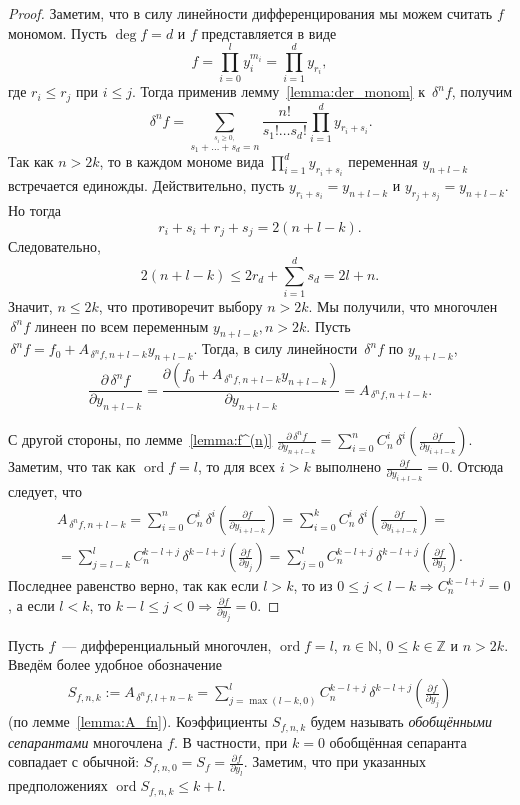 \documentclass[11pt]{article}
\DeclareMathOperator{\ord}{ord}
\renewcommand{\le}{\leqslant}
\renewcommand{\ge}{\geqslant}
\theoremstyle{plain1}
\theoremstyle{plain2}
\theoremstyle{plain}
\theoremstyle{plain3}
\theoremstyle{definition}
\theoremstyle{remark}
\begin{document}
\begin{proof}
Заметим, что в силу линейности дифференцирования мы можем считать
$f$ мономом. Пусть $\deg f = d$ и $f$ представляется в
виде
$$
f=\prod\limits_{i=0}^ly_i^{m_i}=\prod\limits_{i=1}^{d}y_{r_i},
$$
где $r_i\le r_j$ при $i \le j$. Тогда применив лемму~\ref{lemma:der_monom} к $\,\delta^n f$,
получим
$$
\,\delta^n f=\sum\limits_{\stackrel{s_i\ge0,}{
s_1+\ldots+s_d=n}}\frac{n!}{s_1!\ldots s_d!}
\prod\limits_{i=1}^dy_{r_i+s_i}.
$$
Так как $n>2k$, то в каждом мономе вида $\prod_{i=1}^d y_{r_i+s_i}$
переменная $y_{n+l-k}$ встречается единожды. Действительно, пусть
$y_{r_i+s_i}=y_{n+l-k}$ и $y_{r_j+s_j}=y_{n+l-k}$. Но тогда
$$
r_i+s_i+r_j+s_j = 2(n+l-k).
$$
Следовательно,
$$
2(n+l-k)\le 2r_d + \sum_{i=1}^d s_d = 2l +n.
$$
Значит, $n \le 2k$, что противоречит выбору $n>2k$. Мы получили, что многочлен $\,\delta^n f$ линеен по всем переменным $y_{n+l-k},n>2k $. Пусть $\,\delta^n f=f_0+A_{\,\delta^n f,n+l-k}y_{n+l-k}$. Тогда, в силу линейности $\,\delta^n f$ по $y_{n+l-k}$,
$$
\frac{\partial \,\delta^n f}{\partial y_{n+l-k}}=\frac{\partial (f_0+A_{\,\delta^n f,n+l-k}y_{n+l-k})}{\partial y_{n+l-k}}=A_{\,\delta^n f,n+l-k}.
$$

С другой стороны, по лемме~\ref{lemma:f^(n)} $\frac{\partial \,\delta^n f}{\partial y_{n+l-k}}= \sum\limits_{i=0}^n  C_n^i  \,\delta^i\left(\frac{\partial f}{\partial y_{i+l-k}}\right)$. Заметим, что так как $\ord f = l$, то для всех $i>k$ выполнено $\frac{\partial f}{\partial y_{i+l-k}}=0$. Отсюда следует, что 
\begin{gather*}
A_{\,\delta^n f,n+l-k}=\sum\limits_{i=0}^n  C_n^i  \,\delta^i\left(\frac{\partial f}{\partial y_{i+l-k}}\right)=\sum\limits_{i=0}^k  C_n^i  \,\delta^i \left(\frac{\partial f}{\partial y_{i+l-k}}\right)=\\
=\sum\limits_{j=l-k}^l  C_n^{k-l+j}  \,\delta^{k-l+j}\left(\frac{\partial f}{\partial y_{j}}\right)=\sum\limits_{j=0}^{l}C_n^{k - l + j
}\,\delta^{k-l+j}\left(\frac{\partial f}{\partial y_j}\right).
\end{gather*}
Последнее равенство верно, так как если $l>k$, то из $0 \le j<l-k \Longrightarrow C_n^{k-l+j}=0$, а если $l<k$, то  $k-l\le j<0 \Longrightarrow \frac{\partial f}{\partial y_{j}}=0$. 
\end{proof}

Пусть $f$~--- дифференциальный многочлен, $\ord f = l$, $n\in\mathbb{N}$, $0\le k\in\mathbb{Z}$ и $n>2k$.
Введём более удобное обозначение
\begin{gather*}
 S_{f,n,k} := A_{\,\delta^n f, l+n-k} = \sum_{j=\max(l-k,0)}^l C_{n}^{k-l+j} \,\delta^{k-l+j}\left(\frac{\partial f}{\partial y_{j}}\right)
\end{gather*}
(по лемме~\ref{lemma:A_fn}).
Коэффициенты $S_{f,n,k}$ будем называть \emph{обобщёнными сепарантами} многочлена $f$.
В частности, при $k=0$ обобщённая сепаранта совпадает с обычной: $S_{f,n,0}=S_f = \frac{\partial f}{\partial y_l}$. 
Заметим, что при указанных предположениях $\ord S_{f,n,k} \le k+l$.
\end{document}
